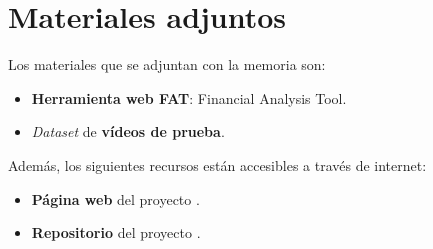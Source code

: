 \section{Materiales adjuntos}\label{materiales-adjuntos}

Los materiales que se adjuntan con la memoria son: 

\begin{itemize}
\tightlist
\item
	\textbf{Herramienta web FAT}: Financial Analysis Tool.
\item	
	\emph{Dataset} de \textbf{vídeos de prueba}.
\end{itemize}

Además, los siguientes recursos están accesibles a través de internet:

\begin{itemize}
\tightlist
\item
  \textbf{Página web} del proyecto \citep{online:FAT_web}.
\item
  \textbf{Repositorio} del proyecto \citep{online:FAT_repo}.
\end{itemize}


